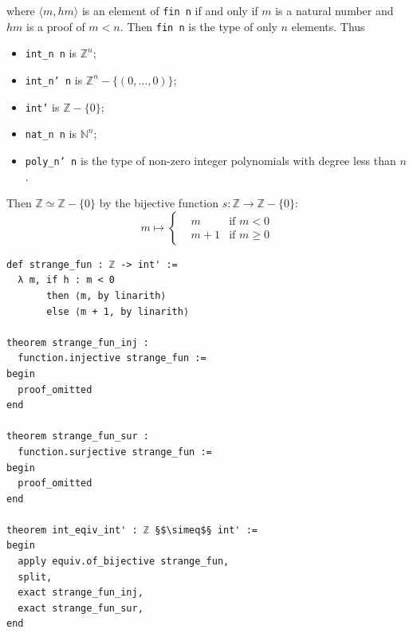 \documentclass{report}
\theoremstyle{definition}
\newenvironment{code}{\captionsetup{type=listing}}{}
\begin{document}
where  $\langle m, hm\rangle$ is an element of {\tt \small fin n} if and only if $m$ is a natural number and $hm$ is a proof of $m < n$. Then {\tt \small fin n} is the type of only $n$ elements. Thus
\begin{itemize}
  \item {\tt \small int\_n n} is $\mathbb Z^n$;
  \item {\tt \small int\_n' n} is $\mathbb Z^n-\{(0,\dots,0)\}$;
  \item {\tt \small int'} is $\mathbb Z-\{0\}$;
  \item {\tt \small nat\_n n} is $\mathbb N^n$;
  \item {\tt \small poly\_n' n} is the type of non-zero integer polynomials with degree less than $n$.
\end{itemize}

Then $\mathbb Z\simeq \mathbb Z-\{0\}$ by the bijective function $s:\mathbb Z\to \mathbb Z-\{0\}$:
\begin{equation*}
m\mapsto\left\{
\begin{aligned}
& m & \text{if }m < 0\\
& m + 1 & \text{if }m \ge 0
\end{aligned}
\right.
\end{equation*}
\begin{code}
\begin{verbatim}
def strange_fun : ℤ -> int' := 
  λ m, if h : m < 0 
       then ⟨m, by linarith⟩ 
       else ⟨m + 1, by linarith⟩

theorem strange_fun_inj : 
  function.injective strange_fun :=
begin
  proof_omitted
end

theorem strange_fun_sur : 
  function.surjective strange_fun :=
begin
  proof_omitted
end

theorem int_eqiv_int' : ℤ §$\simeq$§ int' :=
begin
  apply equiv.of_bijective strange_fun,
  split,
  exact strange_fun_inj,
  exact strange_fun_sur,
end
\end{verbatim}
\caption{$\mathbb Z\simeq \mathbb Z-\{0\}$}
\end{code}
\end{document}
